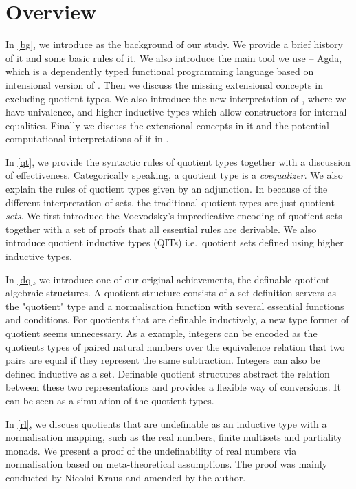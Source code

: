 \section{Overview}



In \autoref{bg}, we introduce \mltt as the background of our study. We provide a brief
history of it and some basic rules of it.
We also introduce the main tool we use -- Agda, which is a dependently typed functional
programming language based on intensional version of \mltt. Then we discuss the missing extensional concepts in \itt excluding quotient types. We also introduce the new interpretation of \hott, where we have univalence, and higher inductive types which allow constructors for internal equalities. Finally we discuss the extensional concepts in it and the potential computational interpretations of it in \itt.


In \autoref{qt}, we provide the syntactic rules of quotient types together with a discussion of effectiveness. Categorically speaking, a quotient type is a \emph{coequalizer}. We also explain the rules of quotient types given by an adjunction. In \hott because of the different interpretation of sets, the traditional quotient types are just quotient \emph{sets}. We first introduce the Voevodsky's impredicative encoding of quotient sets together with a set of proofs that all essential rules are derivable. We also introduce quotient inductive types (QITs) i.e.\ quotient sets defined using higher inductive types.
 


In \autoref{dq}, we introduce one of our original achievements, the
definable quotient algebraic structures. A quotient structure consists of a set definition servers as the "quotient" type and a normalisation function with several essential functions and conditions.
For quotients that are definable inductively, a new type former of quotient seems unnecessary.
As a example, integers can be encoded as the
quotients types of paired natural numbers over the equivalence
relation that two pairs are equal if they represent the same
subtraction. Integers can also be defined inductive as a set. Definable quotient structures abstract the relation between these two representations and provides a flexible way of conversions. It can be seen as 
a simulation of the quotient types.


In \autoref{rl}, we discuss quotients that are undefinable as an inductive type with a normalisation mapping, such as the real numbers, finite multisets and partiality monads. We present a proof of the undefinability of real numbers via normalisation based on meta-theoretical assumptions. The proof was mainly conducted by Nicolai Kraus and amended by the author.

